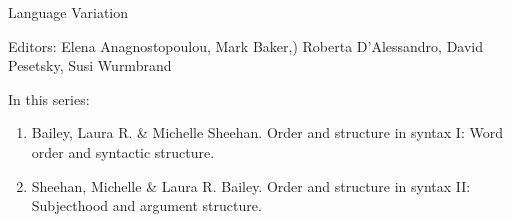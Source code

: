 {\large Language Variation}

\bigskip

Editors:   Elena Anagnostopoulou,
    Mark Baker,)
    Roberta D’Alessandro,
    David Pesetsky,
    Susi Wurmbrand


\bigskip

In this series:

\begin{enumerate}
\item Bailey, Laura R. \& Michelle Sheehan. Order and structure in syntax I: Word order and syntactic structure.
\item Sheehan, Michelle \& Laura R. Bailey.  Order and structure in syntax II: Subjecthood and argument structure.
\end{enumerate}



\vfill



